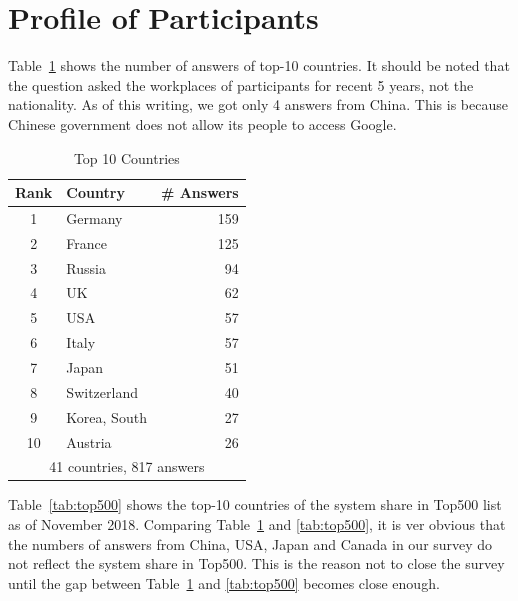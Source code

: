 \documentclass[submit,techrep,noauthor,english]{ipsj}
\begin{document}
\section{Profile of Participants}\label{sec:profile}

Table~\ref{tab:countries} shows the number of answers of top-10
countries. It should be noted that the question asked the workplaces
of participants for recent 5 years, not the nationality. As of this
writing, we got only 4 answers from China. This is because Chinese
government does not allow its people to access Google. 

\begin{table}[htb]%
\begin{center}%
\caption{Top 10 Countries}\label{tab:countries}%
\begin{tabular}{c|l|r}%
\hline%
Rank & Country & \# Answers \hspace{5mm} \\%
\hline%
1 & Germany 	& 159 \hspace{8mm} \\%
2 & France 	& 125 \hspace{8mm} \\%
3 & Russia 	& 94 \hspace{8mm} \\%
4 & UK 		& 62 \hspace{8mm} \\%
5 & USA 	& 57 \hspace{8mm} \\%
6 & Italy 	& 57 \hspace{8mm} \\%
7 & Japan 	& 51 \hspace{8mm} \\%
\hline
8 & Switzerland & 40 \hspace{8mm} \\%
9 & Korea, South & 27 \hspace{8mm} \\%
10 & Austria 	& 26 \hspace{8mm} \\%
\hline%
\multicolumn{3}{c}{41 countries, 817 answers} \\%
\end{tabular}%
\end{center}%
\end{table}%

Table~\ref{tab:top500} shows the top-10 countries of the system share
in Top500 list as of November 2018\cite{Top500}. Comparing
Table~\ref{tab:countries} and \ref{tab:top500}, it is ver obvious that
the numbers of answers from China, USA, Japan and Canada in our survey
do not reflect the system share in Top500.  This is the reason not to
close the survey until the gap between Table~\ref{tab:countries} and
\ref{tab:top500} becomes close enough.
\end{document}
